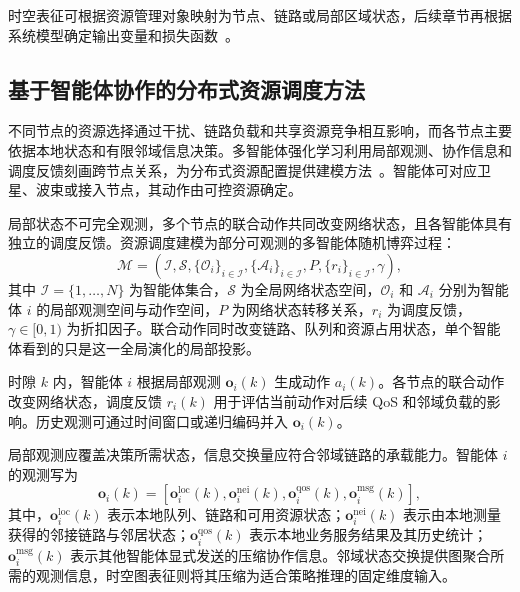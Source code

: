 时空表征可根据资源管理对象映射为节点、链路或局部区域状态，后续章节再根据系统模型确定输出变量和损失函数~\cite{rusek2019unveilinggnn}。

\subsection{基于智能体协作的分布式资源调度方法}

不同节点的资源选择通过干扰、链路负载和共享资源竞争相互影响，而各节点主要依据本地状态和有限邻域信息决策。多智能体强化学习利用局部观测、协作信息和调度反馈刻画跨节点关系，为分布式资源配置提供建模方法~\cite{huh2024multiagentreinforcementlearningcomprehensive}。智能体可对应卫星、波束或接入节点，其动作由可控资源确定。

局部状态不可完全观测，多个节点的联合动作共同改变网络状态，且各智能体具有独立的调度反馈。资源调度建模为部分可观测的多智能体随机博弈过程：
\begin{equation}
    \mathcal M=
    \left(
    \mathcal I,\mathcal S,
    \{\mathcal O_i\}_{i\in\mathcal I},
    \{\mathcal A_i\}_{i\in\mathcal I},
    P,\{r_i\}_{i\in\mathcal I},\gamma
    \right),
\end{equation}
其中 $\mathcal I=\{1,\ldots,N\}$ 为智能体集合，$\mathcal S$ 为全局网络状态空间，$\mathcal O_i$ 和 $\mathcal A_i$ 分别为智能体 $i$ 的局部观测空间与动作空间，$P$ 为网络状态转移关系，$r_i$ 为调度反馈，$\gamma\in[0,1)$ 为折扣因子。联合动作同时改变链路、队列和资源占用状态，单个智能体看到的只是这一全局演化的局部投影\cite{sutton1998reinforcementlearning}。

时隙 $k$ 内，智能体 $i$ 根据局部观测 $\mathbf o_i(k)$ 生成动作 $a_i(k)$。各节点的联合动作改变网络状态，调度反馈 $r_i(k)$ 用于评估当前动作对后续 QoS 和邻域负载的影响。历史观测可通过时间窗口或递归编码并入 $\mathbf o_i(k)$。

局部观测应覆盖决策所需状态，信息交换量应符合邻域链路的承载能力。智能体 $i$ 的观测写为
\begin{equation}
    \mathbf o_i(k)=
    \left[
    \mathbf o_i^{\mathrm{loc}}(k),
    \mathbf o_i^{\mathrm{nei}}(k),
    \mathbf o_i^{\mathrm{qos}}(k),
    \mathbf o_i^{\mathrm{msg}}(k)
    \right],
\end{equation}
其中，$\mathbf o_i^{\mathrm{loc}}(k)$ 表示本地队列、链路和可用资源状态；$\mathbf o_i^{\mathrm{nei}}(k)$ 表示由本地测量获得的邻接链路与邻居状态；$\mathbf o_i^{\mathrm{qos}}(k)$ 表示本地业务服务结果及其历史统计；$\mathbf o_i^{\mathrm{msg}}(k)$ 表示其他智能体显式发送的压缩协作信息。邻域状态交换提供图聚合所需的观测信息，时空图表征则将其压缩为适合策略推理的固定维度输入。

